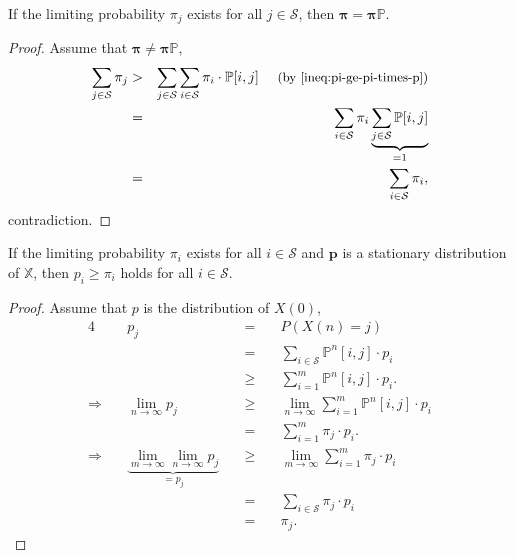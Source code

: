 \begin{equality} \label{eq:pi-eq-pi-times-p}
If the limiting probability $ \pi_{j} $ exists for all $ j \in \mathcal{S} $, then $ \boldsymbol\pi = \boldsymbol\pi \mathbb{P} $.

\begin{proof}
Assume that $ \boldsymbol\pi \neq \boldsymbol\pi \mathbb{P} $,
\begin{eqnarray*}
\sum_{j \in \mathcal{S}} \pi_{j}
  & > & \sum_{j \in \mathcal{S}} \sum_{i \in \mathcal{S}} \pi_{i} \cdot \mathbb{P}[i, j]
    \text{\hspace{1em} \small(by \autoref{ineq:pi-ge-pi-times-p})} \\
  & = & \sum_{i \in \mathcal{S}} \pi_{i} \underbrace{\sum_{j \in \mathcal{S}} \mathbb{P}[i, j]}_{= 1} \\
  & = & \sum_{i \in \mathcal{S}} \pi_{i},
\end{eqnarray*}
contradiction.
\end{proof}
\end{equality}

\begin{inequality} \label{ineq:p-ge-pi}
If the limiting probability $ \pi_{i} $ exists for all $ i \in \mathcal{S} $ and $ \mathbf{p} $ is a stationary distribution of $ \mathbb{X} $, then $ p_{i} \ge \pi_{i} $ holds for all $ i \in \mathcal{S} $.

\begin{proof}
Assume that $ p $ is the distribution of $ X(0) $,
\begin{alignat*}{4}
  & p_{j}
    & \quad=\quad & P(X(n) = j) \\
  & & \quad=\quad & \sum_{i \in \mathcal{S}} \mathbb{P}^{n}[i, j] \cdot p_{i} \\
  & & \quad\ge\quad & \sum_{i = 1}^{m} \mathbb{P}^{n}[i, j] \cdot p_{i}. \\
\Rightarrow\quad
  & \lim_{n \to \infty} p_{j}
    & \quad\ge\quad & \lim_{n \to \infty} \sum_{i = 1}^{m} \mathbb{P}^{n}[i, j] \cdot p_{i} \\
  & & \quad=\quad & \sum_{i = 1}^{m} \pi_{j} \cdot p_{i}. \\
\Rightarrow\quad
  & \underbrace{\lim_{m \to \infty} \lim_{n \to \infty} p_{j}}_{= p_{j}}
    & \quad\ge\quad & \lim_{m \to \infty} \sum_{i = 1}^{m} \pi_{j} \cdot p_{i} \\
  & & \quad=\quad & \sum_{i \in \mathcal{S}} \pi_{j} \cdot p_{i} \\
  & & \quad=\quad & \pi_{j}.
\end{alignat*}
\end{proof}
\end{inequality}


